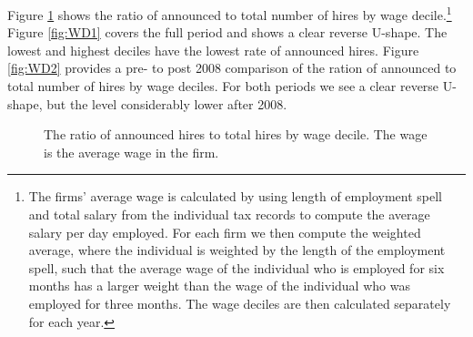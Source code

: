\documentclass[11pt,article]{memoir}
\begin{document}
Figure \ref{fig:WD} shows the ratio of announced to total number of hires by wage decile.\footnote{The firms' average wage is calculated by using length of employment spell and total salary from the individual tax records to compute the average salary per day employed. For each firm we then compute the weighted average, where the individual is weighted by the length of the employment spell, such that the average wage of the individual who is employed for six months has a larger weight than the wage of the individual who was employed for three months. The wage deciles are then calculated separately for each year. } 
Figure \ref{fig:WD1} covers the full period and shows a clear reverse U-shape. The lowest and highest deciles have the lowest rate of announced hires. Figure \ref{fig:WD2}  provides a pre- to post 2008  comparison of the ration of announced to total number of hires by wage deciles. For both periods we see a clear reverse U-shape, but the level considerably lower after 2008. 

% 		

\begin{figure}[h!]
	\caption{The ratio of announced hires to total hires by wage decile. The wage is the average wage in the firm. }
	\label{fig:WD}
\end{figure}
\end{document}
